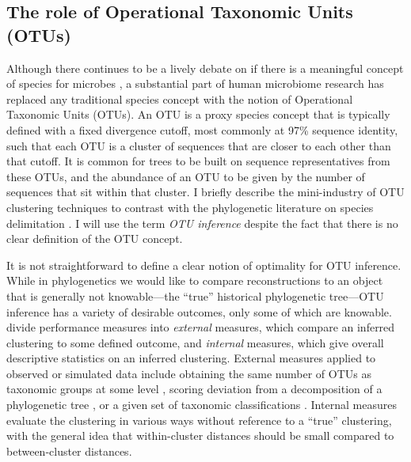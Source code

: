 \documentclass{amsart}
\begin{document}
\subsection{The role of Operational Taxonomic Units (OTUs)}
Although there continues to be a lively debate on if there is a meaningful concept of species for microbes \citep{bapteste2009prokaryotic,caro2012bacterial}, a substantial part of human microbiome research has replaced any traditional species concept with the notion of Operational Taxonomic Units (OTUs).
An OTU is a proxy species concept that is typically defined with a fixed divergence cutoff, most commonly at 97\% sequence identity, such that each OTU is a cluster of sequences that are closer to each other than that cutoff.
It is common for trees to be built on sequence representatives from these OTUs, and the abundance of an OTU to be given by the number of sequences that sit within that cluster.
I briefly describe the mini-industry of OTU clustering techniques to contrast with the phylogenetic literature on species delimitation \citep{pons2006sequence,yang2010bayesian}.
I will use the term \emph{OTU inference} despite the fact that there is no clear definition of the OTU concept.

It is not straightforward to define a clear notion of optimality for OTU inference.
While in phylogenetics we would like to compare reconstructions to an object that is generally not knowable---the ``true'' historical phylogenetic tree---OTU inference has a variety of desirable outcomes, only some of which are knowable.
\citet{Wang2013-ol} divide performance measures into \textit{external} measures, which compare an inferred clustering to some defined outcome, and \textit{internal} measures, which give overall descriptive statistics on an inferred clustering.
External measures applied to observed or simulated data include obtaining the same number of OTUs as taxonomic groups at some level \citep[e.g.][]{edgar2013uparse}, scoring deviation from a decomposition of a phylogenetic tree \citep[e.g.][]{navlakha2009finding}, or a given set of taxonomic classifications \citep[e.g.][]{Cai2011-bi}.
Internal measures evaluate the clustering in various ways without reference to a ``true'' clustering, with the general idea that within-cluster distances should be small compared to between-cluster distances.
\end{document}
